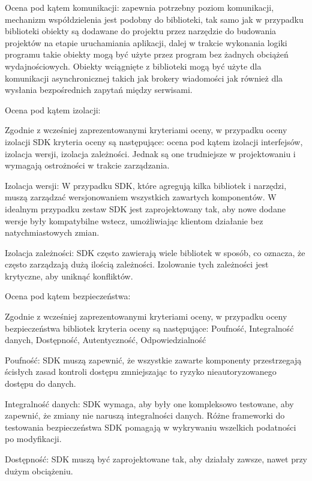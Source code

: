 \documentclass[runningheads,12pt]{llncs}
\begin{document}
Ocena pod kątem komunikacji: zapewnia potrzebny poziom komunikacji, mechanizm współdzielenia jest podobny do biblioteki, tak samo jak w przypadku biblioteki obiekty są dodawane do projektu przez narzędzie do budowania projektów na etapie uruchamiania aplikacji, dalej w trakcie wykonania logiki programu takie obiekty mogą być użyte przez program bez żadnych obciążeń wydajnościowych. Obiekty wciągnięte z biblioteki mogą być użyte dla komunikacji asynchronicznej takich jak brokery wiadomości jak również dla wysłania bezpośrednich zapytań między serwisami.

Ocena pod kątem izolacji: 

Zgodnie z wcześniej zaprezentowanymi kryteriami oceny, w przypadku oceny izolacji SDK kryteria oceny są następujące: ocena pod kątem izolacji interfejsów, izolacja wersji, izolacja zależności. Jednak są one trudniejsze w projektowaniu i wymagają ostrożności w trakcie zarządzania. ~\cite[p. 75]{EssentialIan}

Izolacja wersji: W przypadku SDK, które agregują kilka bibliotek i narzędzi, muszą zarządzać wersjonowaniem wszystkich zawartych komponentów. W idealnym przypadku zestaw SDK jest zaprojektowany tak, aby nowe dodane wersje były kompatybilne wstecz, umożliwiając klientom działanie bez natychmiastowych zmian.

Izolacja zależności: SDK często zawierają wiele bibliotek w sposób, co oznacza, że często zarządzają dużą ilością zależności. Izolowanie tych zależności jest krytyczne, aby uniknąć konfliktów. ~\cite[p. 218]{martin2008clean}

Ocena pod kątem bezpieczeństwa: 

Zgodnie z wcześniej zaprezentowanymi kryteriami oceny, w przypadku oceny bezpieczeństwa bibliotek kryteria oceny są następujące: Poufność, Integralność danych, Dostępność, Autentyczność, Odpowiedzialność

Poufność: SDK muszą zapewnić, że wszystkie zawarte komponenty przestrzegają ścisłych zasad kontroli dostępu zmniejszając to ryzyko nieautoryzowanego dostępu do danych.  ~\cite[para 4]{azure2020}

Integralność danych: SDK wymaga, aby były one kompleksowo testowane, aby zapewnić, że zmiany nie naruszą integralności danych. Różne frameworki do testowania bezpieczeństwa SDK pomagają w wykrywaniu wszelkich podatności po modyfikacji.  ~\cite[para 5]{azure2020}

Dostępność: SDK muszą być zaprojektowane tak, aby działały zawsze, nawet przy dużym obciążeniu. ~\cite[para 6]{azure2020}
\end{document}
